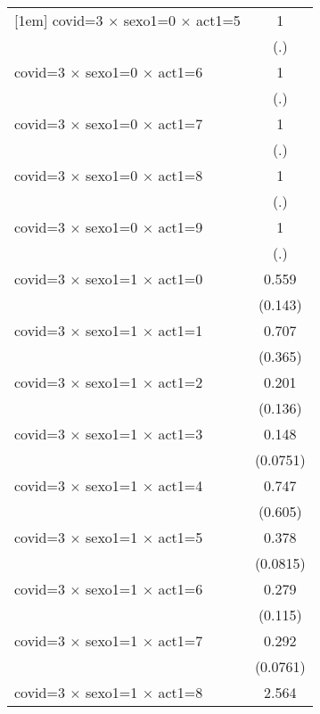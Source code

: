{\begin{tabular}{l*{1}{c}}
[1em]
covid=3 $\times$ sexo1=0 $\times$ act1=5&           1         \\
                    &         (.)         \\
[1em]
covid=3 $\times$ sexo1=0 $\times$ act1=6&           1         \\
                    &         (.)         \\
[1em]
covid=3 $\times$ sexo1=0 $\times$ act1=7&           1         \\
                    &         (.)         \\
[1em]
covid=3 $\times$ sexo1=0 $\times$ act1=8&           1         \\
                    &         (.)         \\
[1em]
covid=3 $\times$ sexo1=0 $\times$ act1=9&           1         \\
                    &         (.)         \\
[1em]
covid=3 $\times$ sexo1=1 $\times$ act1=0&       0.559\sym{*}  \\
                    &     (0.143)         \\
[1em]
covid=3 $\times$ sexo1=1 $\times$ act1=1&       0.707         \\
                    &     (0.365)         \\
[1em]
covid=3 $\times$ sexo1=1 $\times$ act1=2&       0.201\sym{*}  \\
                    &     (0.136)         \\
[1em]
covid=3 $\times$ sexo1=1 $\times$ act1=3&       0.148\sym{***}\\
                    &    (0.0751)         \\
[1em]
covid=3 $\times$ sexo1=1 $\times$ act1=4&       0.747         \\
                    &     (0.605)         \\
[1em]
covid=3 $\times$ sexo1=1 $\times$ act1=5&       0.378\sym{***}\\
                    &    (0.0815)         \\
[1em]
covid=3 $\times$ sexo1=1 $\times$ act1=6&       0.279\sym{**} \\
                    &     (0.115)         \\
[1em]
covid=3 $\times$ sexo1=1 $\times$ act1=7&       0.292\sym{***}\\
                    &    (0.0761)         \\
[1em]
covid=3 $\times$ sexo1=1 $\times$ act1=8&       2.564\sym{**} \\

\end{tabular}}
